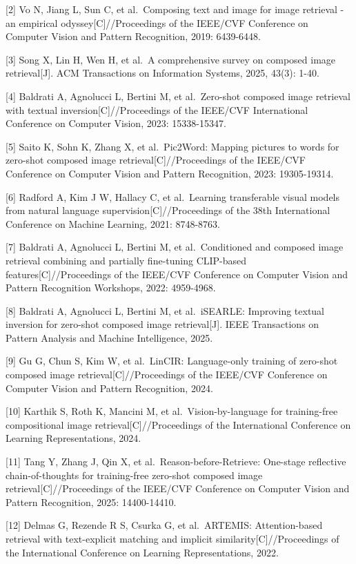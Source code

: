 \documentclass[12pt,a4paper,UTF8,oneside,openany]{ctexrep}
\begin{document}
{[}2{]} Vo N, Jiang L, Sun C, et al.~Composing text and image for image
retrieval - an empirical odyssey{[}C{]}//Proceedings of the IEEE/CVF
Conference on Computer Vision and Pattern Recognition, 2019: 6439-6448.

{[}3{]} Song X, Lin H, Wen H, et al.~A comprehensive survey on composed
image retrieval{[}J{]}. ACM Transactions on Information Systems, 2025,
43(3): 1-40.

{[}4{]} Baldrati A, Agnolucci L, Bertini M, et al.~Zero-shot composed
image retrieval with textual inversion{[}C{]}//Proceedings of the
IEEE/CVF International Conference on Computer Vision, 2023: 15338-15347.

{[}5{]} Saito K, Sohn K, Zhang X, et al.~Pic2Word: Mapping pictures to
words for zero-shot composed image retrieval{[}C{]}//Proceedings of the
IEEE/CVF Conference on Computer Vision and Pattern Recognition, 2023:
19305-19314.

{[}6{]} Radford A, Kim J W, Hallacy C, et al.~Learning transferable
visual models from natural language supervision{[}C{]}//Proceedings of
the 38th International Conference on Machine Learning, 2021: 8748-8763.

{[}7{]} Baldrati A, Agnolucci L, Bertini M, et al.~Conditioned and
composed image retrieval combining and partially fine-tuning CLIP-based
features{[}C{]}//Proceedings of the IEEE/CVF Conference on Computer
Vision and Pattern Recognition Workshops, 2022: 4959-4968.

{[}8{]} Baldrati A, Agnolucci L, Bertini M, et al.~iSEARLE: Improving
textual inversion for zero-shot composed image retrieval{[}J{]}. IEEE
Transactions on Pattern Analysis and Machine Intelligence, 2025.

{[}9{]} Gu G, Chun S, Kim W, et al.~LinCIR: Language-only training of
zero-shot composed image retrieval{[}C{]}//Proceedings of the IEEE/CVF
Conference on Computer Vision and Pattern Recognition, 2024.

{[}10{]} Karthik S, Roth K, Mancini M, et al.~Vision-by-language for
training-free compositional image retrieval{[}C{]}//Proceedings of the
International Conference on Learning Representations, 2024.

{[}11{]} Tang Y, Zhang J, Qin X, et al.~Reason-before-Retrieve:
One-stage reflective chain-of-thoughts for training-free zero-shot
composed image retrieval{[}C{]}//Proceedings of the IEEE/CVF Conference
on Computer Vision and Pattern Recognition, 2025: 14400-14410.

{[}12{]} Delmas G, Rezende R S, Csurka G, et al.~ARTEMIS:
Attention-based retrieval with text-explicit matching and implicit
similarity{[}C{]}//Proceedings of the International Conference on
Learning Representations, 2022.
\end{document}
